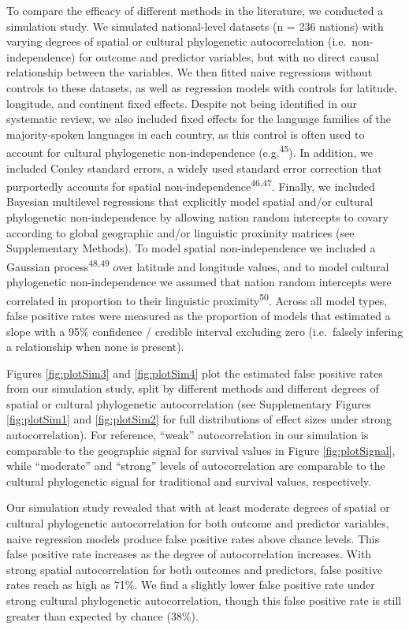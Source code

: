 \documentclass[english,man,floatsintext]{apa6}
\begin{document}
To compare the efficacy of different methods in the literature, we conducted a simulation study. We simulated national-level datasets (n = 236 nations) with varying degrees of spatial or cultural phylogenetic autocorrelation (i.e.~non-independence) for outcome and predictor variables, but with no direct causal relationship between the variables. We then fitted naive regressions without controls to these datasets, as well as regression models with controls for latitude, longitude, and continent fixed effects. Despite not being identified in our systematic review, we also included fixed effects for the language families of the majority-spoken languages in each country, as this control is often used to account for cultural phylogenetic non-independence (e.g.\textsuperscript{45}). In addition, we included Conley standard errors, a widely used standard error correction that purportedly accounts for spatial non-independence\textsuperscript{46,47}. Finally, we included Bayesian multilevel regressions that explicitly model spatial and/or cultural phylogenetic non-independence by allowing nation random intercepts to covary according to global geographic and/or linguistic proximity matrices (see Supplementary Methods). To model spatial non-independence we included a Gaussian process\textsuperscript{48,49} over latitude and longitude values, and to model cultural phylogenetic non-independence we assumed that nation random intercepts were correlated in proportion to their linguistic proximity\textsuperscript{50}. Across all model types, false positive rates were measured as the proportion of models that estimated a slope with a 95\% confidence / credible interval excluding zero (i.e.~falsely infering a relationship when none is present).

Figures \ref{fig:plotSim3} and \ref{fig:plotSim4} plot the estimated false positive rates from our simulation study, split by different methods and different degrees of spatial or cultural phylogenetic autocorrelation (see Supplementary Figures \ref{fig:plotSim1} and \ref{fig:plotSim2} for full distributions of effect sizes under strong autocorrelation). For reference, \enquote{weak} autocorrelation in our simulation is comparable to the geographic signal for survival values in Figure \ref{fig:plotSignal}, while \enquote{moderate} and \enquote{strong} levels of autocorrelation are comparable to the cultural phylogenetic signal for traditional and survival values, respectively.

Our simulation study revealed that with at least moderate degrees of spatial or cultural phylogenetic autocorrelation for both outcome and predictor variables, naive regression models produce false positive rates above chance levels. This false positive rate increases as the degree of autocorrelation increases. With strong spatial autocorrelation for both outcomes and predictors, false positive rates reach as high as 71\%. We find a slightly lower false positive rate under strong cultural phylogenetic autocorrelation, though this false positive rate is still greater than expected by chance (38\%).
\end{document}
